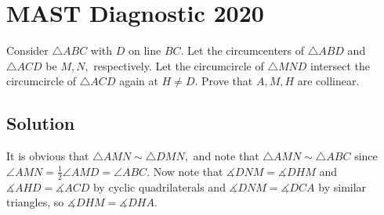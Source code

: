 \documentclass[mast]{lucky}
\begin{document}
\pagebreak\section{MAST Diagnostic 2020}

Consider $\triangle ABC$ with $D$ on line $BC.$ Let the circumcenters of $\triangle ABD$ and $\triangle ACD$ be $M,N,$ respectively. Let the circumcircle of $\triangle MND$ intersect the circumcircle of $\triangle ACD$ again at $H\neq D.$ Prove that $A,M,H$ are collinear.

\subsection{Solution}

It is obvious that $\triangle AMN\sim \triangle DMN,$ and note that $\triangle AMN\sim\triangle ABC$ since $\angle AMN=\frac{1}{2}\angle AMD=\angle ABC.$ Now note that $\measuredangle DNM=\measuredangle DHM$ and $\measuredangle AHD=\measuredangle ACD$ by cyclic quadrilaterals and $\measuredangle DNM=\measuredangle DCA$ by similar triangles, so $\measuredangle DHM=\measuredangle DHA.$
\end{document}
